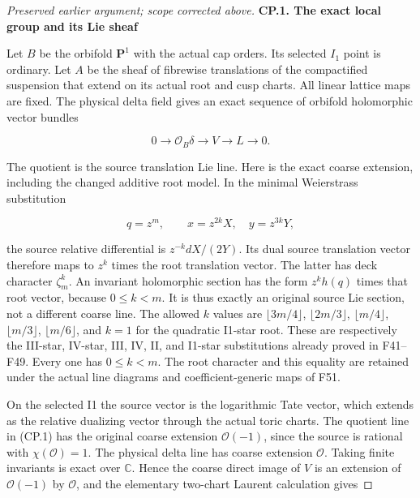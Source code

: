 \begin{proof}[Preserved earlier argument; scope corrected above]
\par

\medskip\noindent\textbf{CP.1. The exact local group and its Lie sheaf}

\par\nobreak

Let \(B\) be the orbifold \(\mathbf P^1\) with the actual cap orders. Its selected \(I_1\)
point is ordinary. Let \(A\) be the sheaf of fibrewise translations of the
compactified suspension that extend on its actual root and cusp charts.
All linear lattice maps are fixed. The physical delta field gives an
exact sequence of orbifold holomorphic vector bundles

\[
 0\longrightarrow\mathcal O_B\delta\longrightarrow V
       \longrightarrow L\longrightarrow0.                 \tag{CP.1}
\]

The quotient is the source translation Lie line. Here is the exact
coarse extension, including the changed additive root model. In the
minimal Weierstrass substitution

\[
 q=z^m,\qquad x=z^{2k}X,\quad y=z^{3k}Y,
\]

the source relative differential is \(z^{-k}dX/(2Y)\). Its dual source
translation vector therefore maps to \(z^k\) times the root translation
vector. The latter has deck character \(\zeta_m^k\). An invariant holomorphic
section has the form \(z^k h(q)\) times that root vector, because \(0\leq k<m\).
It is thus exactly an original source Lie section, not a different
coarse line. The allowed \(k\) values are \(\lfloor3m/4\rfloor\), \(\lfloor2m/3\rfloor\),
\(\lfloor m/4\rfloor\), \(\lfloor m/3\rfloor\), \(\lfloor m/6\rfloor\), and \(k=1\) for the quadratic I1-star
root. These are respectively the III-star, IV-star, III, IV, II, and
I1-star substitutions already proved in F41--F49. Every one has
\(0\leq k<m\). The root character and this equality are retained under the
actual line diagrams and coefficient-generic maps of F51.

On the selected I1 the source vector is the logarithmic Tate vector,
which extends as the relative dualizing vector through the actual
toric charts. The quotient line in (CP.1) has the original coarse
extension \(\mathcal O(-1)\), since the source is rational with \(\chi(\mathcal O)=1\). The
physical delta line has coarse extension \(\mathcal O\). Taking finite invariants
is exact over \(\mathbb C\). Hence the coarse direct image of \(V\) is an extension
of \(\mathcal O(-1)\) by \(\mathcal O\), and the elementary two-chart Laurent calculation gives


\end{proof}
